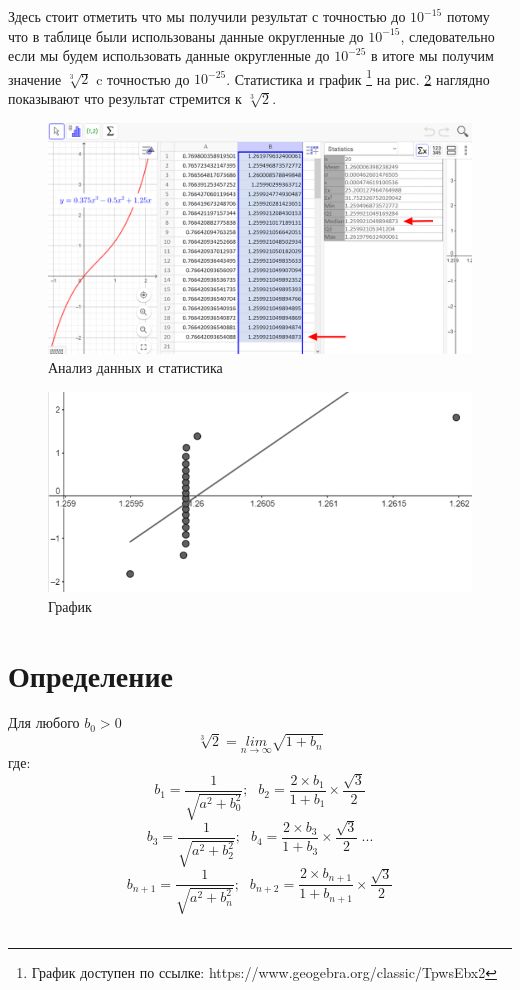 \documentclass[12pt, letterpaper, oneside]{report}
\begin{document}
Здесь стоит отметить что мы получили результат с точностью до $10^{-15}$ потому что в таблице были использованы данные округленные до $10^{-15}$, следовательно если мы будем использовать данные округленные до $10^{-25}$ в итоге мы получим значение $\sqrt[3]{2}$ c точностью до $10^{-25}$. Статистика и график \footnote{График доступен по ссылке:  https://www.geogebra.org/classic/TpwsEbx2} на рис. \ref{fig:plot} наглядно показывают  что результат стремится к $\sqrt[3]{2}$.
\\
\begin{figure}[h]
	\centering
	\includegraphics[width=0.88\linewidth]{images/Table_arrow.png}
	\caption{Анализ данных и статистика}
	\label{fig:data}
\end{figure}
\begin{figure}[h]
	\centering
	\includegraphics[width=0.68\linewidth]{images/plot.png}
	\caption{График}
	\label{fig:plot}
\end{figure}
\newpage

\section{Определение}
Для любого $b_{0} > 0$
\begin{equation}
\sqrt[3]{2}= \underset{n\to \infty }{lim} \sqrt{1+b_{n}}
\end{equation}
где:   
\begin{equation}
b_{1}=\dfrac{1}{\sqrt{a^{2}+b_{0}^{2}}};\ \hspace{5pt} b_{2}=\frac{2\times b_{1}}{1+b_{1}}\times\frac{\sqrt{3}}{2}
\end{equation}
\begin{equation}
b_{3}=\dfrac{1}{\sqrt{a^{2}+b_{2}^{2}}};\ \hspace{5pt} b_{4}=\frac{2\times b_{3}}{1+b_{3}}\times\frac{\sqrt{3}}{2} \ ...
\end{equation}
\begin{equation}
b_{n+1}=\dfrac{1}{\sqrt{a^{2}+b_{n}^{2}}};\ \hspace{5pt} b_{n+2}=\frac{2\times b_{n+1}}{1+b_{n+1}}\times\frac{\sqrt{3}}{2}
\end{equation}
\\
\end{document}
